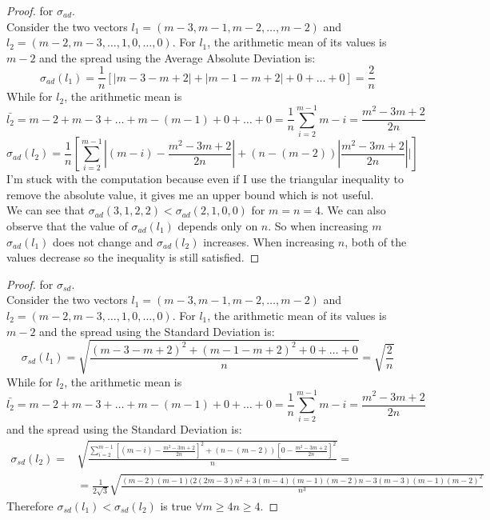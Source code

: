 \documentclass[version=3.21, pagesize, twoside=off, bibliography=totoc, DIV=calc, fontsize=12pt, a4paper]{scrartcl}
\begin{document}
\begin{proof} for $\sigma_{ad}$. \\
	Consider the two vectors $l_1=(m-3, m-1, m-2, \dots, m-2)$ and $l_2=(m-2, m-3, \dots, 1, 0, \dots, 0)$. For $l_1$, the arithmetic mean of its values is $m-2$ and the spread using the Average Absolute Deviation is: 
	\[\sigma_{ad}(l_1)=\frac{1}{n}[|m-3-m+2|+|m-1-m+2|+ 0 + \dots + 0]= \frac{2}{n}\]
	While for $l_2$, the arithmetic mean is 
	\[\bar{l_2}=m-2+m-3+\dots+m-(m-1)+0+\dots+0= \frac{1}{n}\sum_{i=2}^{m-1}{m-i}= \frac{m^2-3m+2}{2n}\]
	\[\sigma_{ad}(l_2)=\frac{1}{n}[\sum_{i=2}^{m-1}{|(m-i)-\frac{m^2-3m+2}{2n}|+(n-(m-2))|\frac{m^2-3m+2}{2n}|}|]\]
	I'm stuck with the computation because even if I use the triangular inequality to remove the absolute value, it gives me an upper bound which is not useful. 
	\\\newline We can see that $\sigma_{ad}(3,1,2,2)<\sigma_{ad}(2,1,0,0)$ for $m=n=4$. We can also observe that the value of $\sigma_{ad}(l_1)$ depends only on $n$. So when increasing $m$ $\sigma_{ad}(l_1)$ does not change and $\sigma_{ad}(l_2)$ increases. When increasing $n$, both of the values decrease so the inequality is still satisfied. 
\end{proof}

\begin{proof} for $\sigma_{sd}$. \\
	Consider the two vectors $l_1=(m-3, m-1, m-2, \dots, m-2)$ and $l_2=(m-2, m-3, \dots, 1, 0, \dots, 0)$. For $l_1$, the arithmetic mean of its values is $m-2$ and the spread using the Standard Deviation is: 
	\[\sigma_{sd}(l_1)=\sqrt{\frac{(m-3-m+2)^2+(m-1-m+2)^2+ 0 + \dots + 0}{n}}= \sqrt{\frac{2}{n}}\]
	While for $l_2$, the arithmetic mean is 
	\[\bar{l_2}=m-2+m-3+\dots+m-(m-1)+0+\dots+0= \frac{1}{n}\sum_{i=2}^{m-1}{m-i}= \frac{m^2-3m+2}{2n}\]
	and the spread using the Standard Deviation is: 
	\begin{align}
		\sigma_{sd}(l_2)=&\sqrt{\frac{\sum_{i=2}^{m-1}{[(m-i)-\frac{m^2-3m+2}{2n}]^2+(n-(m-2))[0-\frac{m^2-3m+2}{2n}]^2}}{n}}= \\
		& =\textstyle{\frac{1}{2 \sqrt{3}} \sqrt{\frac{(m - 2) (m - 1) (2 (2 m - 3) n^2 + 3 (m - 4) (m - 1) (m - 2) n - 3 (m - 3) (m - 1) (m - 2)^2}{n^3}}}
	\end{align}
	Therefore $\sigma_{sd}(l_1)<\sigma_{sd}(l_2)$ is true $\forall m \geq 4 n\geq 4$.
\end{proof}
\end{document}
